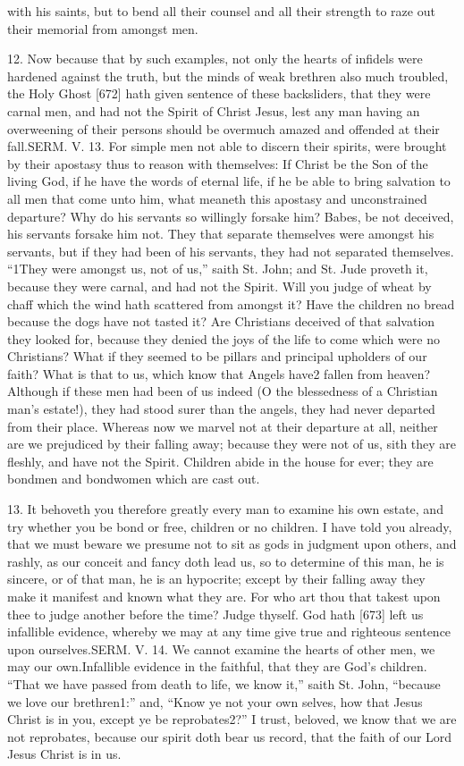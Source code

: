 with his saints, but to bend all their counsel and all their strength to raze out their memorial from amongst men.

12. Now because that by such examples, not only the hearts of infidels were hardened against the truth, but the minds of weak brethren also much troubled, the Holy Ghost [672] hath given sentence of these backsliders, that they were carnal men, and had not the Spirit of Christ Jesus, lest any man having an overweening of their persons should be overmuch amazed and offended at their fall.SERM. V. 13. For simple men not able to discern their spirits, were brought by their apostasy thus to reason with themselves: If Christ be the Son of the living God, if he have the words of eternal life, if he be able to bring salvation to all men that come unto him, what meaneth this apostasy and unconstrained departure? Why do his servants so willingly forsake him? Babes, be not deceived, his servants forsake him not. They that separate themselves were amongst his servants, but if they had been of his servants, they had not separated themselves. “1They were amongst us, not of us,” saith St. John; and St. Jude proveth it, because they were carnal, and had not the Spirit. Will you judge of wheat by chaff which the wind hath scattered from amongst it? Have the children no bread because the dogs have not tasted it? Are Christians deceived of that salvation they looked for, because they denied the joys of the life to come which were no Christians? What if they seemed to be pillars and principal upholders of our faith? What is that to us, which know that Angels have2 fallen from heaven? Although if these men had been of us indeed (O the blessedness of a Christian man’s estate!), they had stood surer than the angels, they had never departed from their place. Whereas now we marvel not at their departure at all, neither are we prejudiced by their falling away; because they were not of us, sith they are fleshly, and have not the Spirit. Children abide in the house for ever; they are bondmen and bondwomen which are cast out.

13. It behoveth you therefore greatly every man to examine his own estate, and try whether you be bond or free, children or no children. I have told you already, that we must beware we presume not to sit as gods in judgment upon others, and rashly, as our conceit and fancy doth lead us, so to determine of this man, he is sincere, or of that man, he is an hypocrite; except by their falling away they make it manifest and known what they are. For who art thou that takest upon thee to judge another before the time? Judge thyself. God hath [673] left us infallible evidence, whereby we may at any time give true and righteous sentence upon ourselves.SERM. V. 14. We cannot examine the hearts of other men, we may our own.Infallible evidence in the faithful, that they are God’s children. “That we have passed from death to life, we know it,” saith St. John, “because we love our brethren1:” and, “Know ye not your own selves, how that Jesus Christ is in you, except ye be reprobates2?” I trust, beloved, we know that we are not reprobates, because our spirit doth bear us record, that the faith of our Lord Jesus Christ is in us.

